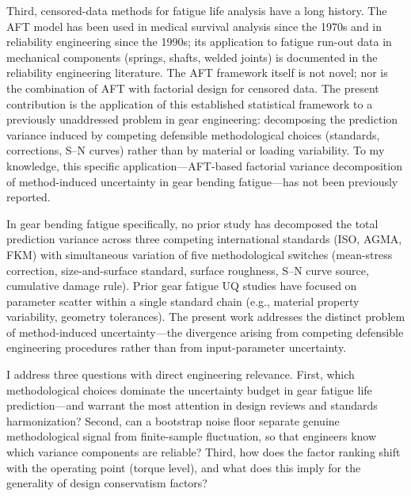 \documentclass[twocolumn,12pt,a4paper]{article}
\begin{document}
Third, censored-data methods for fatigue life analysis have a long
history. The AFT model has been used in medical survival analysis since
the 1970s and in reliability engineering since the 1990s; its
application to fatigue run-out data in mechanical components (springs,
shafts, welded joints) is documented in the reliability engineering
literature. The AFT framework itself is not novel; nor is the
combination of AFT with factorial design for censored data. The
present contribution is the application of this established
statistical framework to a previously unaddressed problem in gear
engineering: decomposing the prediction variance induced by competing
defensible methodological choices (standards, corrections, S--N
curves) rather than by material or loading variability. To my
knowledge, this specific application---AFT-based factorial variance
decomposition of method-induced uncertainty in gear bending
fatigue---has not been previously reported.

In gear bending fatigue specifically, no prior study has decomposed the
total prediction variance across three competing international
standards (ISO, AGMA, FKM) with simultaneous variation of five
methodological switches (mean-stress correction, size-and-surface
standard, surface roughness, S--N curve source, cumulative damage
rule). Prior gear fatigue UQ studies have focused on parameter scatter
within a single standard chain (e.g., material property variability,
geometry tolerances). The present work addresses the distinct problem
of method-induced uncertainty---the divergence arising from competing
defensible engineering procedures rather than from input-parameter
uncertainty.

I address three questions with direct engineering relevance. First,
which methodological choices dominate the uncertainty budget in gear
fatigue life prediction---and warrant the most attention in
design reviews and standards harmonization? Second, can a bootstrap
noise floor separate genuine methodological signal from finite-sample
fluctuation, so that engineers know which variance components are
reliable? Third, how does the factor ranking shift with the operating
point (torque level), and what does this imply for the generality of
design conservatism factors?
\end{document}
